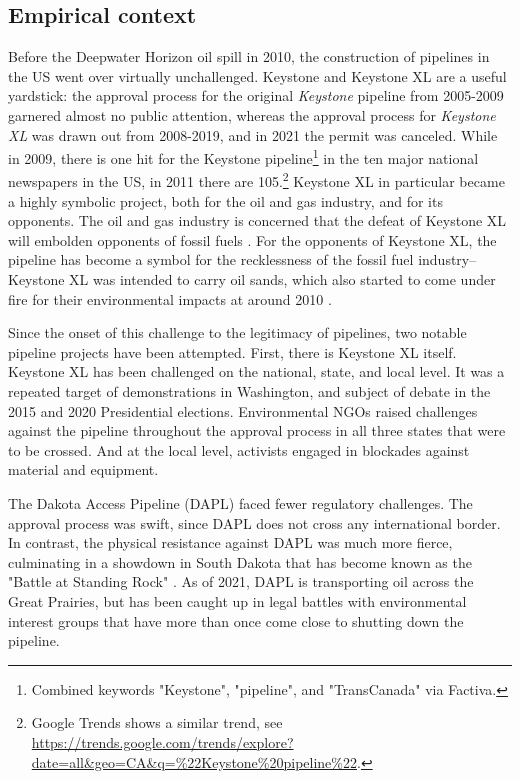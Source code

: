 
\subsection*{Empirical context}

Before the Deepwater Horizon oil spill in 2010, the construction of pipelines in the US went over virtually unchallenged. Keystone and Keystone XL are a useful yardstick: the approval process for the original \textit{Keystone} pipeline from 2005-2009 garnered almost no public attention, whereas the approval process for \textit{Keystone XL} was drawn out from 2008-2019, and in 2021 the permit was canceled. While in 2009, there is one hit for the Keystone pipeline\footnote{Combined keywords "Keystone", "pipeline", and "TransCanada" via Factiva.} in the ten major national newspapers in the US, in 2011 there are 105.\footnote{Google Trends shows a similar trend, see \url{https://trends.google.com/trends/explore?date=all&geo=CA&q=\%22Keystone\%20pipeline\%22}.} Keystone XL in particular became a highly symbolic project, both for the oil and gas industry, and for its opponents. The oil and gas industry is concerned that the defeat of Keystone XL will embolden opponents of fossil fuels \citep{Freitas2021}. For the opponents of Keystone XL, the pipeline has become a symbol for the recklessness of the fossil fuel industry--Keystone XL was intended to carry oil sands, which also started to come under fire for their environmental impacts at around 2010 \citep{Schindler2010}.

Since the onset of this challenge to the legitimacy of pipelines, two notable pipeline projects have been attempted. First, there is Keystone XL itself. Keystone XL has been challenged on the national, state, and local level. It was a repeated target of demonstrations in Washington, and subject of debate in the 2015 and 2020 Presidential elections. Environmental NGOs raised challenges against the pipeline throughout the approval process in all three states that were to be crossed. And at the local level, activists engaged in blockades against material and equipment.

The Dakota Access Pipeline (DAPL) faced fewer regulatory challenges. The approval process was swift, since DAPL does not cross any international border. In contrast, the physical resistance against DAPL was much more fierce, culminating in a showdown in South Dakota that has become known as the "Battle at Standing Rock" \citep{Read2016}. As of 2021, DAPL is transporting oil across the Great Prairies, but has been caught up in legal battles with environmental interest groups that have more than once come close to shutting down the pipeline.

